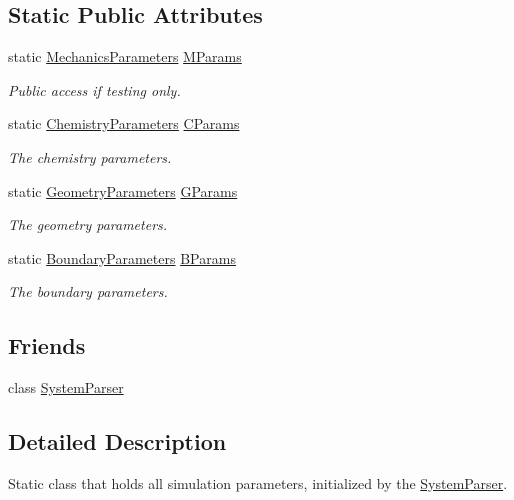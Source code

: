 \subsection*{Static Public Attributes}
\begin{DoxyCompactItemize}
\item 
static \hyperlink{structMechanicsParameters}{Mechanics\+Parameters} \hyperlink{classSystemParameters_a6640957e85bee1d107f2c9e8e0f4ca9d}{M\+Params}
\begin{DoxyCompactList}\small\item\em Public access if testing only. \end{DoxyCompactList}\item 
static \hyperlink{structChemistryParameters}{Chemistry\+Parameters} \hyperlink{classSystemParameters_aca60412ffdeba39dd42733d8c7ce13a8}{C\+Params}
\begin{DoxyCompactList}\small\item\em The chemistry parameters. \end{DoxyCompactList}\item 
static \hyperlink{structGeometryParameters}{Geometry\+Parameters} \hyperlink{classSystemParameters_ae96aa9a5a7f9accf304a44349b97a5ed}{G\+Params}
\begin{DoxyCompactList}\small\item\em The geometry parameters. \end{DoxyCompactList}\item 
static \hyperlink{structBoundaryParameters}{Boundary\+Parameters} \hyperlink{classSystemParameters_a74866443b1beee882b4e053fa1120969}{B\+Params}
\begin{DoxyCompactList}\small\item\em The boundary parameters. \end{DoxyCompactList}\end{DoxyCompactItemize}
\subsection*{Friends}
\begin{DoxyCompactItemize}
\item 
class \hyperlink{classSystemParameters_ac46a56866fc9d9abe5fc1b873c8c8cb8}{System\+Parser}
\end{DoxyCompactItemize}


\subsection{Detailed Description}
Static class that holds all simulation parameters, initialized by the \hyperlink{classSystemParser}{System\+Parser}. 

